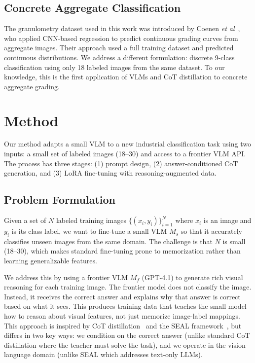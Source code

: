\documentclass{bmvc2k}
\def\etal{\emph{et al}\bmvaOneDot}
\begin{document}
\subsection{Concrete Aggregate Classification}

The granulometry dataset used in this work was introduced by Coenen \etal~\cite{coenen2022learning}, who applied CNN-based regression to predict continuous grading curves from aggregate images. Their approach used a full training dataset and predicted continuous distributions. We address a different formulation: discrete 9-class classification using only 18 labeled images from the same dataset. To our knowledge, this is the first application of VLMs and CoT distillation to concrete aggregate grading.


\section{Method}
\label{sec:method}

Our method adapts a small VLM to a new industrial classification task using two inputs: a small set of labeled images (18--30) and access to a frontier VLM API. The process has three stages: (1) prompt design, (2) answer-conditioned CoT generation, and (3) LoRA fine-tuning with reasoning-augmented data.

\subsection{Problem Formulation}

Given a set of $N$ labeled training images $\{(x_i, y_i)\}_{i=1}^{N}$ where $x_i$ is an image and $y_i$ is its class label, we want to fine-tune a small VLM $M_s$ so that it accurately classifies unseen images from the same domain. The challenge is that $N$ is small (18--30), which makes standard fine-tuning prone to memorization rather than learning generalizable features.

We address this by using a frontier VLM $M_f$ (GPT-4.1) to generate rich visual reasoning for each training image. The frontier model does not classify the image. Instead, it receives the correct answer and explains why that answer is correct based on what it sees. This produces training data that teaches the small model how to reason about visual features, not just memorize image-label mappings. This approach is inspired by CoT distillation~\cite{hsieh2023distilling} and the SEAL framework~\cite{zweiger2025seal}, but differs in two key ways: we condition on the correct answer (unlike standard CoT distillation where the teacher must solve the task), and we operate in the vision-language domain (unlike SEAL which addresses text-only LLMs).
\end{document}
